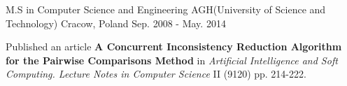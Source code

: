 

\begin{cventries}

  \cventry
    {M.S in Computer Science and Engineering} %
    {AGH(University of Science and Technology)} %
    {Cracow, Poland} %
    {Sep. 2008 - May. 2014} %
    {
      \begin{cvitems} %
        \item {Published an article \textbf{A Concurrent Inconsistency Reduction Algorithm for the Pairwise Comparisons Method} in \textit{Artificial Intelligence and Soft Computing. Lecture Notes in Computer Science} II (9120) pp. 214-222.}
      \end{cvitems}
    }


\end{cventries}
